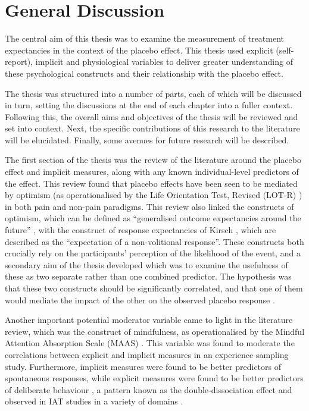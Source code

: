 

\section{General Discussion}

The central aim of this thesis was to examine the measurement of
treatment expectancies in the context of the placebo effect. This
thesis used explicit (self-report), implicit and physiological
variables to deliver greater understanding of these psychological
constructs and their relationship with the placebo effect.


The thesis was structured into a number of parts, each of which will
be discussed in turn, setting the discussions at the end of each
chapter into a fuller context. Following this, the overall aims and
objectives of the thesis will be reviewed and set into context. Next, the specific contributions of this research to the literature will be elucidated. 
Finally, some avenues for future research will be described.

The first section of the thesis was the review of the literature
around the placebo effect and implicit measures, along with any known
individual-level predictors of the effect. This review found that
placebo effects have been seen to be mediated by optimism (as
operationalised by the Life Orientation Test, Revised (LOT-R)
\cite{Scheier1994}) \cite{Geers2005,morton2009reproducibility} in both
pain and non-pain paradigms. This review also linked the constructs of
optimism, which can be defined as ``generalised outcome expectancies
around the future'' \cite{Carver2010}, with the construct of response
expectancies of Kirsch \cite{Kirsch1985,Kirsch1997}, which are
described as the ``expectation of a non-volitional response''. These
constructs both crucially rely on the participants' perception of the
likelihood of the event, and a secondary aim of the thesis developed
which was to examine the usefulness of these as two separate rather
than one combined predictor. The hypothesis was that these two
constructs should be significantly correlated, and that one of them
would mediate the impact of the other on the observed placebo response
\cite{Geers2005}.

Another important potential moderator variable came to light in the
literature review, which was the construct of mindfulness, as
operationalised by the Mindful Attention Absorption Scale (MAAS)
\cite{brown2003benefits}. This variable was found to moderate the
correlations between explicit and implicit measures in an experience
sampling study. Furthermore, implicit measures were found to be better
predictors of spontaneous responses, while explicit measures were
found to be better predictors of deliberate behaviour
\cite{Levesque2007}, a pattern known as the double-dissociation effect
and observed in IAT studies in a variety of domains
\cite{Asendorpf2002,Perugini2005,Grumm2007,Steffens2006}.

